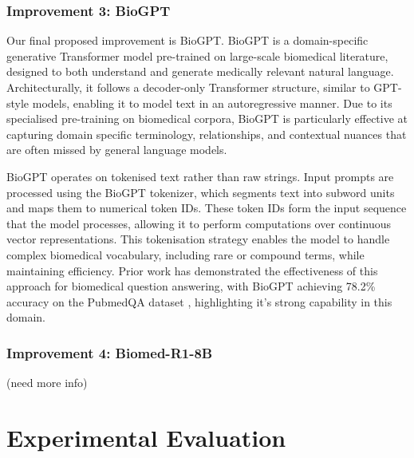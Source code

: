 \documentclass[11pt]{article}
\begin{document}
\subsubsection{Improvement 3: BioGPT}
Our final proposed improvement is BioGPT. BioGPT is a domain-specific generative Transformer model pre-trained on large-scale biomedical literature, designed to both understand and generate medically relevant natural language. Architecturally, it follows a decoder-only Transformer structure, similar to GPT-style models, enabling it to model text in an autoregressive manner. Due to its specialised pre-training on biomedical corpora, BioGPT is particularly effective at capturing domain specific terminology, relationships, and contextual nuances that are often missed by general language models. \par
BioGPT operates on tokenised text rather than raw strings. Input prompts are processed using the BioGPT tokenizer, which segments text into subword units and maps them to numerical token IDs. These token IDs form the input sequence that the model processes, allowing it to perform computations over continuous vector representations. This tokenisation strategy enables the model to handle complex biomedical vocabulary, including rare or compound terms, while maintaining efficiency. Prior work has demonstrated the effectiveness of this approach for biomedical question answering, with BioGPT achieving 78.2\% accuracy on the PubmedQA dataset \cite{luo_biogpt_2022}, highlighting it’s strong capability in this domain. \par

\subsubsection{Improvement 4: Biomed-R1-8B}
(need more info) \par

\section{Experimental Evaluation}
\end{document}
